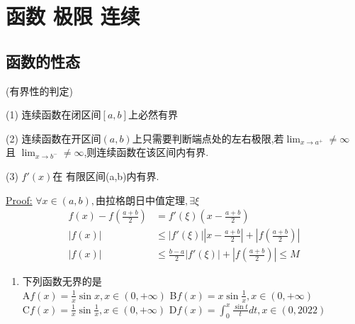 \documentclass[12pt, a4paper, oneside, UTF8]{ctexbook}
\begin{document}

\else
\fi

\chapter{函数 极限 连续}
\section{函数的性态}
\begin{remark}(有界性的判定)
    \item[(1)] 连续函数在闭区间$[a,b]$上必然有界 

    \item[(2)] 连续函数在开区间$(a,b)$上只需要判断端点处的左右极限,若$\lim_{x\to a^{+}}\neq \infty$ 且
    $\lim_{x\to b^{-}}\neq \infty$,则连续函数在该区间内有界.

    \item[(3)] $f'(x)$在{\color{red} 有限}区间(a,b)内有界.

    \underline{Proof:}
    $\forall x\in (a,b),\text{由拉格朗日中值定理},\exists\xi$ 
    \begin{align*}
        f(x)-f(\frac{a+b}{2}) &=f'(\xi)(x-\frac{a+b}{2}) \\
        \left|f(x)\right| &\leq \left|f'(\xi)\right|\left|x-\frac{a+b}{2}\right|+\left|f(\frac{a+b}{2})\right| \\
        \left|f(x)\right| &\leq \frac{b-a}{2}\left|f'(\xi)\right|+\left|f(\frac{a+b}{2})\right| \leq M
    \end{align*}
\end{remark}

\begin{enumerate}[label=\arabic*.]
    \item  下列函数无界的是 \\
    A\quad $f(x)=\frac{1}{x}\sin x, x\in(0,+\infty)$\qquad
    B\quad $f(x)=x\sin\frac{1}{x}, x\in(0,+\infty)$ \\
    C\quad $f(x)=\frac{1}{x}\sin\frac{1}{x}, x\in(0,+\infty)$ \qquad
    D\quad $f(x)=\int_0^x\frac{\sin t}{t} dt, x\in(0,2022)$
    
\end{enumerate}
\end{document}
